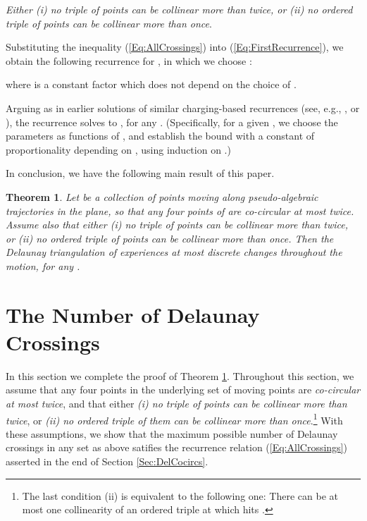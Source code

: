 \documentclass[letter,11pt]{article}
\newtheorem{theorem}{Theorem}[section]
\begin{document}
\smallskip
{\it Either (i) no triple of points can be collinear more than twice, or (ii) no ordered triple of points can be collinear more than once}. 

\smallskip
Substituting the inequality (\ref{Eq:AllCrossings}) into (\ref{Eq:FirstRecurrence}), we obtain the following recurrence for , in which we choose : 

where  is a constant factor which does not depend on the choice of .

Arguing as in earlier solutions of similar charging-based recurrences (see, e.g., \cite{Envelopes3D,ConstantLines}, or \cite[Section 7.3.2]{SA95}), the recurrence solves to
, for any . (Specifically, for a given , we choose the parameters  as functions of , and establish the bound  with a constant of proportionality depending on , using induction on .) 

In conclusion, we have the following main result of this paper.

\begin{theorem}\label{Thm:OverallBound}
Let  be a collection of  points moving along pseudo-algebraic trajectories in the plane, so that any four points of  are co-circular at most twice. Assume also that either (i) no triple of points can be collinear more than twice, or (ii) no {\it ordered} triple of points can be collinear more than once. Then the Delaunay triangulation  of  experiences at most  discrete changes throughout the motion, for any .
\end{theorem}


\section{The Number of Delaunay Crossings}\label{Sec:CrossOnce}

In this section we complete the proof of Theorem \ref{Thm:OverallBound}. 
Throughout this section, we assume that any four points in the underlying set  of  moving points are {\it co-circular at most twice}, and that either {\it (i) no triple of points can be collinear more than twice}, or {\it (ii) no ordered triple of them can be collinear more than once}.\footnote{The last condition (ii) is equivalent to the following one: There can be at most one collinearity of an ordered triple  at which  hits .}
With these assumptions, we show that the maximum possible number  of Delaunay crossings in any set  as above satifies
the recurrence relation (\ref{Eq:AllCrossings}) asserted in the end of Section \ref{Sec:DelCocircs}.
\end{document}
